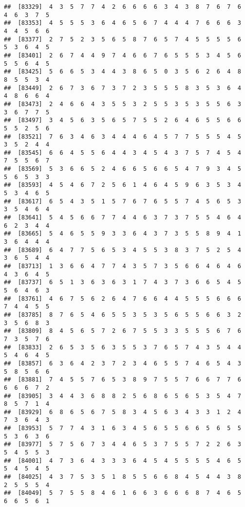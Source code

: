\documentclass[
]{book}
\begin{document}
\begin{verbatim}
##  [83329]  4  3  5  7  7  4  2  6  6  6  6  3  4  3  8  7  6  7  6  4  6  3  7  5
##  [83353]  4  5  5  5  3  6  4  6  5  6  7  4  4  4  7  6  6  6  3  4  4  5  6  6
##  [83377]  2  7  5  2  3  5  6  5  8  7  6  5  7  4  5  5  5  5  6  5  3  6  4  5
##  [83401]  2  6  7  4  4  9  7  4  6  6  7  6  5  5  5  3  4  5  6  5  5  6  4  5
##  [83425]  5  6  6  5  3  4  4  3  8  6  5  0  3  5  6  2  6  4  8  8  5  5  3  4
##  [83449]  2  6  7  3  6  7  3  7  2  3  5  5  5  8  3  5  3  6  4  4  8  6  6  4
##  [83473]  2  4  6  6  4  3  5  5  3  2  5  5  3  5  3  5  5  6  3  3  6  7  7  5
##  [83497]  3  4  5  6  3  5  6  5  7  5  5  2  6  4  6  5  5  6  6  5  5  2  5  6
##  [83521]  7  6  3  4  6  3  4  4  4  6  4  5  7  7  5  5  5  4  5  3  5  2  4  4
##  [83545]  6  6  4  5  5  6  4  4  3  4  5  4  3  7  5  7  4  5  4  7  5  5  6  7
##  [83569]  5  3  6  6  5  2  4  6  6  5  6  6  5  4  7  9  3  4  5  5  6  5  3  3
##  [83593]  4  5  4  6  7  2  5  6  1  4  6  4  5  9  6  3  5  3  4  5  3  4  6  5
##  [83617]  6  5  4  3  5  1  5  7  6  7  6  5  5  7  4  5  6  5  3  3  5  4  6  4
##  [83641]  5  4  5  6  6  7  7  4  4  6  3  7  3  7  5  5  4  6  4  6  2  3  4  4
##  [83665]  5  4  6  5  5  9  3  3  6  4  3  7  3  5  5  8  9  4  1  3  6  4  4  4
##  [83689]  6  4  7  7  5  6  5  3  4  5  5  3  8  3  7  5  2  5  4  3  6  5  4  4
##  [83713]  1  3  6  6  4  7  7  4  3  5  7  3  5  6  6  4  6  4  6  4  3  6  4  5
##  [83737]  6  5  1  3  6  3  6  3  1  7  4  3  7  3  6  6  5  4  5  5  6  4  6  3
##  [83761]  4  6  7  5  6  2  6  4  7  6  6  4  4  5  5  5  6  6  6  7  4  4  5  5
##  [83785]  8  7  6  5  4  6  5  5  3  5  3  5  6  5  5  6  6  3  2  3  5  6  8  3
##  [83809]  8  4  5  6  5  7  2  6  7  5  5  3  3  5  5  5  6  7  6  7  3  5  7  6
##  [83833]  2  6  5  3  5  6  3  5  5  3  7  6  5  7  4  3  5  4  4  5  4  6  4  5
##  [83857]  6  3  6  4  2  3  7  2  3  4  6  5  5  7  4  6  5  4  3  5  8  5  6  6
##  [83881]  7  4  5  5  7  6  5  3  8  9  7  5  5  7  6  6  7  7  6  6  6  6  7  2
##  [83905]  3  4  4  3  6  8  8  2  5  6  8  6  5  6  5  3  5  4  7  8  5  7  1  4
##  [83929]  6  8  6  5  6  7  5  8  3  4  5  6  3  4  3  3  1  2  4  7  3  6  4  3
##  [83953]  5  7  7  4  3  1  6  3  4  5  6  5  5  6  6  5  6  5  5  5  3  6  3  6
##  [83977]  5  7  5  6  7  3  4  4  6  5  3  7  5  5  7  2  2  6  3  5  4  5  5  3
##  [84001]  4  7  3  6  4  3  3  3  6  4  5  4  5  5  5  5  4  6  5  5  4  5  4  5
##  [84025]  4  3  7  5  3  5  1  8  5  5  6  6  8  4  5  4  4  3  8  2  5  5  5  4
##  [84049]  5  7  5  5  8  4  6  1  6  6  3  6  6  6  8  7  4  6  5  6  6  5  6  1

\end{verbatim}
\end{document}
